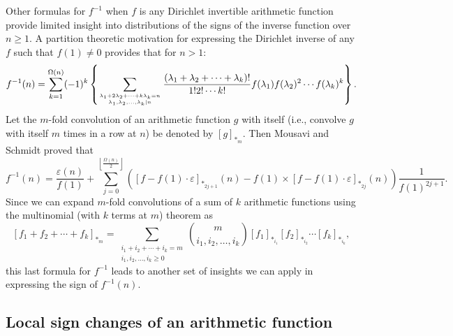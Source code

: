 \documentclass[11pt,reqno]{amsart}
\numberwithin{figure}{section}
\numberwithin{table}{section}
\theoremstyle{plain}
\numberwithin{theorem}{section}
\theoremstyle{definition}
\begin{document}
Other formulas for $f^{-1}$ when $f$ is any Dirichlet invertible arithmetic function provide limited 
insight into distributions of the signs of the inverse function over $n \geq 1$. 
A partition theoretic motivation for expressing the Dirichlet inverse of any $f$ such that 
$f(1) \neq 0$ provides that for $n > 1$: 
\begin{equation} 
\label{eqn_fInvDirInv_PartitionsFormula} 
f^{-1}(n) = \sum_{k=1}^{\Omega(n)} (-1)^k \left\{ 
     \sum_{{\lambda_1+2\lambda_2+\cdots+k\lambda_k=n} \atop {\lambda_1, \lambda_2, \ldots, \lambda_k | n}} 
     \frac{(\lambda_1+\lambda_2+\cdots+\lambda_k)!}{1! 2! \cdots k!} 
     f(\lambda_1) f(\lambda_2)^2 \cdots f(\lambda_k)^k\right\}. 
\end{equation} 
Let the $m$-fold convolution of an arithmetic function $g$ with itself (i.e., convolve 
$g$ with itself $m$ times in a row at $n$) be denoted by $[g]_{\ast_m}$. Then 
Mousavi and Schmidt proved that \cite{MOUSAVI-SCHMIDT-2019} 
\begin{equation} 
\label{eqn_} 
f^{-1}(n) = \frac{\varepsilon(n)}{f(1)} + 
     \sum_{j=0}^{\left\lfloor \frac{\Omega(n)}{2} \right\rfloor} \left( 
     [f-f(1)\cdot\varepsilon]_{\ast_{2j+1}}(n) - f(1) \times 
     [f-f(1)\cdot\varepsilon]_{\ast_{2j}}(n)
     \right) \frac{1}{f(1)^{2j+1}}. 
\end{equation} 
Since we can expand $m$-fold convolutions of a sum of $k$ arithmetic functions using the 
multinomial (with $k$ terms at $m$) theorem as 
\[
[f_1+f_2+\cdots+f_k]_{\ast_m} = \sum_{\substack{i_1+i_2+\cdots+i_k = m \\ i_1,i_2,\ldots,i_k \geq 0}} 
     \binom{m}{i_1,i_2,\ldots,i_k} [f_1]_{\ast_{i_1}} [f_2]_{\ast_{i_2}} \cdots 
     [f_k]_{\ast_{i_k}}, 
\]
this last formula for $f^{-1}$ leads to another set of insights we can apply in expressing the 
sign of $f^{-1}(n)$. 

\subsection{Local sign changes of an arithmetic function} 
\end{document}
